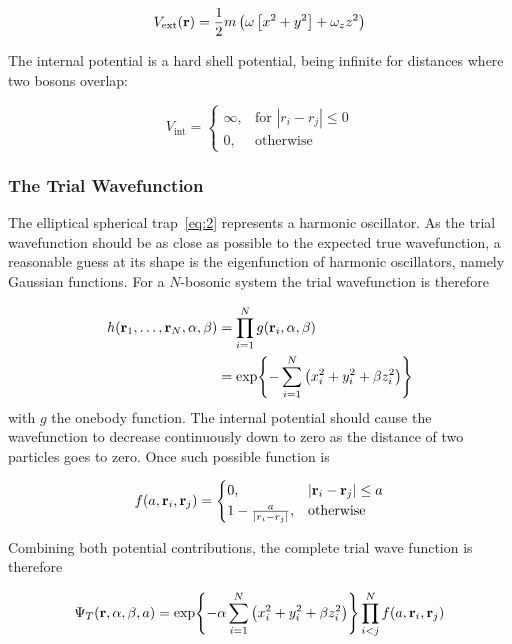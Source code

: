 \begin{equation}
  \label{eq:2}
  V_{\text{ext}}(\vb{r}) = \frac{1}{2}m\left( \omega\left[ x^{2} + y^{2} \right] + \omega_{z}z^{2} \right)
\end{equation}

The internal potential is a hard shell potential, being infinite for distances
where two bosons overlap:

\begin{equation*}
  V_{\text{int}} = \begin{cases}
    \infty, &\text{for } |r_{i} - r_{j}| \le 0\\
    0, &\text{otherwise}
    \end{cases}
\end{equation*}

\subsubsection{The Trial Wavefunction}

The elliptical spherical trap~\eqref{eq:2} represents a harmonic oscillator. As
the trial wavefunction should be as close as possible to the expected true
wavefunction, a reasonable guess at its shape is the eigenfunction of
harmonic oscillators, namely Gaussian functions. For a \(N\)-bosonic system the
trial wavefunction is therefore

\begin{align*}
  h(\vb{r}_{1}, \ldots, \vb{r}_{N}, \alpha, \beta) &= \prod_{i=1}^{N}g(\vb{r}_{i}, \alpha, \beta)\\
  &= \exp{-\sum_{i=1}^{N}\left( x_{i}^{2} + y_{i}^{2}+\beta z_{i}^{2} \right)}
\end{align*}
with \(g\) the onebody function.
The internal potential should cause the wavefunction to decrease continuously
down to zero as the distance of two particles goes to zero. Once such possible
function is

\begin{equation*}
  f(a, \vb{r}_{i}, \vb{r}_{j}) = \begin{cases}
    0, &|\vb{r}_{i} - \vb{r}_{j}| \le a\\
    1 - \frac{a}{\abs{r_{i}-r_{j}}}, &\text{otherwise}
    \end{cases}
\end{equation*}

Combining both potential contributions, the complete trial wave function is
therefore

\begin{equation*}
  \Psi_{T}(\vb{r}, \alpha, \beta, a) = \exp{-\alpha\sum_{i=1}^{N}\left( x_{i}^{2} + y^{2}_{i} + \beta z^{2}_{i} \right)}
  \prod_{i<j}^{N}f(a, \vb{r}_{i}, \vb{r}_{j})
\end{equation*}

